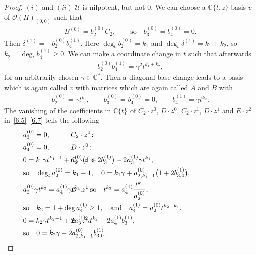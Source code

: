 \documentclass[pdftex]{sigma}%
\numberwithin{equation}{section}
\numberwithin{figure}{section}
\newcommand{\C}{{\mathbb C}}
\newcommand{\OO}{{\mathcal O}}
\newcommand{\UU}{{\mathcal U}}
\newcommand{\uuuu}{\underline}
\begin{document}
\begin{proof}
$(i)$ and $(ii)$ $\UU$ is nilpotent, but not 0.
We can choose a $\C\{t,z\}$-basis $\uuuu{v}$ of
$\OO(H)_{(0,0)}$ such that
\begin{gather*}%
B^{(0)}=b_2^{(0)}C_2,\qquad \text{so}\quad
b_3^{(0)}=b_4^{(0)}=0.
\end{gather*}
Then $\delta^{(1)}=-b_2^{(0)}b_4^{(1)}$.
Here $\deg_tb_2^{(0)}=k_1$ and $\deg_t\delta^{(1)}=k_1+k_2$,
so $k_2=\deg_tb_4^{(1)} \geq 0$. We can make a
coordinate change in $t$ such that afterwards
\begin{gather*}
b_2^{(0)}b_4^{(1)}=\gamma^2t^{k_1+k_2},
\end{gather*}
for an arbitrarily chosen $\gamma\in\C^*$.
Then a diagonal base change leads to a basis which is
again called $\uuuu{v}$ with matrices which are again
called $A$ and $B$ with
\begin{gather*}%
b_2^{(0)}=\gamma t^{k_1},\qquad
b_3^{(0)}=b_4^{(0)}=0,\qquad
b_4^{(1)}=\gamma t^{k_2}.
\end{gather*}
The vanishing of the coefficients in $\C\{t\}$ of
$C_2\cdot z^0$, $D\cdot z^0$, $C_2\cdot z^1$, $D\cdot z^1$
and $E\cdot z^2$ in~\eqref{6.5}--\eqref{6.7}
tells the following
\begin{align*}
&C_2\cdot z^0\colon &&\hspace{-40mm} a_3^{(0)}=0,
\\
&D\cdot z^0\colon &&\hspace{-40mm}a_4^{(0)}=0,
\\
&C_2\cdot z^1\colon
&&\hspace{-40mm}0=k_1\gamma t^{k_1-1}+a_2^{(0)}\big(1+2b_3^{(1)}\big)-2a_3^{(1)}\gamma t^{k_1},
\\
&&&\hspace{-40mm}\text{so}\quad \deg_t a_2^{(0)}=k_1-1, \quad
0=k_1\gamma +a_{2,k_1-1}^{(0)}\big(1+2b_{3,0}^{(1)}\big),
\\
&D\cdot z^1\colon &&\hspace{-40mm}a_2^{(0)}\gamma t^{k_2}=a_4^{(1)}\gamma t^{k_1},\quad
\text{so}\quad t^{k_2}=a_4^{(1)}\frac{t^{k_1}}{a_2^{(0)}},
\\
&&&\hspace{-40mm}\text{so}\quad k_2=1+\deg a_4^{(1)}\geq 1,\quad\text{and}\quad
a_4^{(1)}=a_2^{(0)}t^{k_2-k_1},
\\
&E\cdot z^2\colon &&\hspace{-40mm}
0=k_2\gamma t^{k_2-1}+2a_3^{(1)}\gamma t^{k_2}-2a_4^{(1)}b_3^{(1)},
\\
&&&\hspace{-40mm} \text{so}\quad 0=k_2\gamma -2a_{2,k_1-1}^{(0)}b_{3,0}^{(1)}.

\end{align*}
\end{proof}
\end{document}
